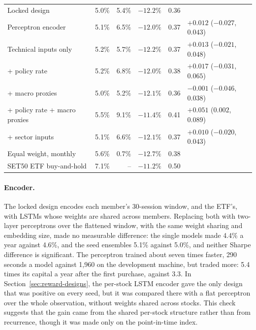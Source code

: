 \begin{table}[!ht]
\begin{tabularx}{\textwidth}{@{}Yrrrrl@{}}
Locked design & 5.0\% & 5.4\% & $-12.2\%$ & 0.36 & \\
Perceptron encoder & 5.1\% & 6.5\% & $-12.0\%$ & 0.37 & $+0.012$ ($-0.027$, $0.043$) \\
Technical inputs only & 5.2\% & 5.7\% & $-12.2\%$ & 0.37 & $+0.013$ ($-0.021$, $0.048$) \\
+ policy rate & 5.2\% & 6.8\% & $-12.0\%$ & 0.38 & $+0.017$ ($-0.031$, $0.065$) \\
+ macro proxies & 5.0\% & 5.2\% & $-12.1\%$ & 0.36 & $-0.001$ ($-0.046$, $0.038$) \\
+ policy rate + macro proxies & 5.5\% & 9.1\% & $-11.4\%$ & 0.41 & $+0.051$ ($0.002$, $0.089$) \\
+ sector inputs & 5.1\% & 6.6\% & $-12.1\%$ & 0.37 & $+0.010$ ($-0.020$, $0.043$) \\
\addlinespace
Equal weight, monthly & 5.6\% & 0.7\% & $-12.7\%$ & 0.38 & \\
SET50 ETF buy-and-hold & 7.1\% & -- & $-11.2\%$ & 0.50 & \\
\bottomrule
\end{tabularx}
\end{table}

\paragraph{Encoder.} The locked design encodes each member's 30-session window, and the ETF's, with LSTMs
whose weights are shared across members. Replacing both with two-layer perceptrons over the flattened
window, with the same weight sharing and embedding size, made no measurable difference: the single
models made 4.4\% a year against 4.6\%, and the seed ensembles 5.1\% against 5.0\%, and neither Sharpe
difference is significant. The perceptron trained about seven times faster, 290 seconds a model against
1{,}960 on the development machine, but traded more: 5.4 times its capital a year after the first
purchase, against 3.3. In Section~\ref{sec:reward-designs}, the per-stock LSTM encoder gave the only
design that was positive on every seed, but it was compared there with a flat perceptron over the whole
observation, without weights shared across stocks. This check suggests that the gain came from the
shared per-stock structure rather than from recurrence, though it was made only on the point-in-time
index.

